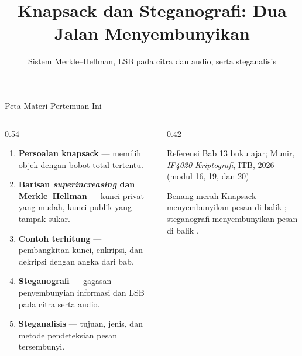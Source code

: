 \documentclass[aspectratio=169,11pt]{beamer}
\title{Knapsack dan Steganografi: Dua Jalan Menyembunyikan}
\subtitle{Sistem Merkle--Hellman, LSB pada citra dan audio, serta steganalisis}
\begin{document}
\begin{frame}[plain]
    \titlepage
\end{frame}

\begin{frame}{Peta Materi Pertemuan Ini}
    \begin{columns}[T,onlytextwidth]
        \begin{column}{0.54\textwidth}
            \footnotesize
            \begin{enumerate}
                \item \textbf{Persoalan knapsack} --- memilih objek dengan
                      bobot total tertentu.
                \item \textbf{Barisan \textit{superincreasing} dan
                      Merkle--Hellman} --- kunci privat yang mudah, kunci
                      publik yang tampak sukar.
                \item \textbf{Contoh terhitung} --- pembangkitan kunci,
                      enkripsi, dan dekripsi dengan angka dari bab.
                \item \textbf{Steganografi} --- gagasan penyembunyian
                      informasi dan LSB pada citra serta audio.
                \item \textbf{Steganalisis} --- tujuan, jenis, dan metode
                      pendeteksian pesan tersembunyi.
            \end{enumerate}
        \end{column}
        \begin{column}{0.42\textwidth}
            \begin{block}{Referensi}
                \footnotesize
                Bab 13 buku ajar; Munir, \textit{IF4020 Kriptografi}, ITB,
                2026 (modul 16, 19, dan 20)
            \end{block}
            \begin{exampleblock}{Benang merah}
                \footnotesize
                Knapsack menyembunyikan pesan di balik ; steganografi menyembunyikan pesan di balik
                .
            \end{exampleblock}
        \end{column}
    \end{columns}
\end{frame}
\end{document}
